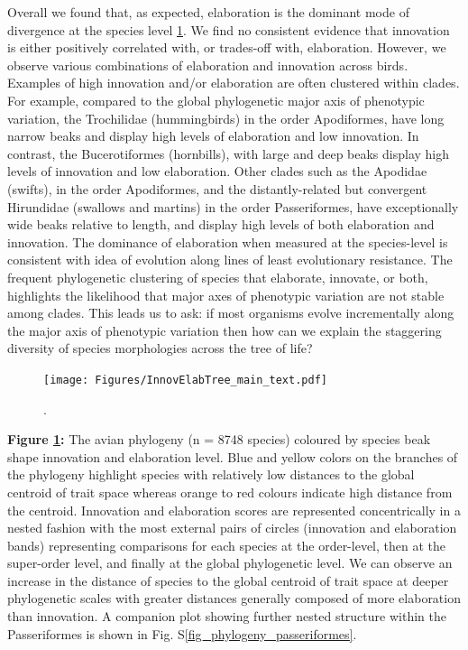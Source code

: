 \documentclass[12pt,letterpaper]{article}
\begin{document}
Overall we found that, as expected, elaboration is the dominant mode of divergence at the species level \ref{Fig:phylogeny}.
We find no consistent evidence that innovation is either positively correlated with, or trades-off with, elaboration. %
However, we observe various combinations of elaboration and innovation across birds.
Examples of high innovation and/or elaboration are often clustered within clades.
For example, compared to the global phylogenetic major axis of phenotypic variation, the Trochilidae (hummingbirds) in the order Apodiformes, have long narrow beaks and display high levels of elaboration and low innovation.
In contrast, the Bucerotiformes (hornbills), with large and deep beaks display high levels of innovation and low elaboration.
Other clades such as the Apodidae (swifts), in the order Apodiformes, and the distantly-related but convergent Hirundidae (swallows and martins) in the order Passeriformes, have exceptionally wide beaks relative to length, and display high levels of both elaboration and innovation.
The dominance of elaboration when measured at the species-level is consistent with idea of evolution along lines of least evolutionary resistance.
The frequent phylogenetic clustering of species that elaborate, innovate, or both, highlights the likelihood that major axes of phenotypic variation are not stable among clades.
This leads us to ask: if most organisms evolve incrementally along the major axis of phenotypic variation then how can we explain the staggering diversity of species morphologies across the tree of life? 

\begin{figure}[!htbp]
\centering
    \texttt{[image: Figures/InnovElabTree\_main\_text.pdf]}
\caption{.}
\label{Fig:phylogeny}
\end{figure}


\bigskip

\noindent \textbf{Figure \ref{Fig:phylogeny}:} The avian phylogeny (n = 8748 species) coloured by species beak shape innovation and elaboration level.
Blue and yellow colors on the branches of the phylogeny highlight species with relatively low distances to the global centroid of trait space whereas orange to red colours indicate high distance from the centroid.
Innovation and elaboration scores are represented concentrically in a nested fashion with the most external pairs of circles (innovation and elaboration bands) representing comparisons for each species at the order-level, then at the super-order level, and finally at the global phylogenetic level.
We can observe an increase in the distance of species to the global centroid of trait space at deeper phylogenetic scales with greater distances generally composed of more elaboration than innovation.
A companion plot showing further nested structure within the Passeriformes is shown in Fig. S\ref{fig_phylogeny_passeriformes}. 
\end{document}
